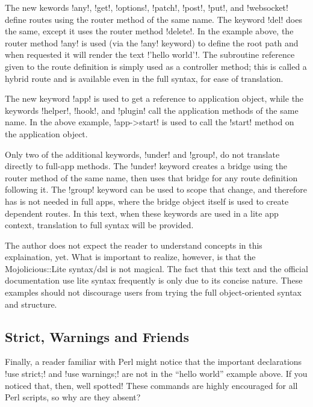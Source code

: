 The new kewords \lstmojolite!any!, \lstmojolite!get!, \lstmojolite!options!, \lstmojolite!patch!, 
\lstmojolite!post!, \lstmojolite!put!, and \lstmojolite!websocket! define routes using the router method of the same name. 
The keyword \lstmojolite!del! does the same, except it uses the router method \lstperl!delete!.
In the example above, the router method \lstperl!any! is used (via the \lstmojolite!any! keyword) 
to define the root path and when requested it will render the text \lstperl!'hello world'!.
The subroutine reference given to the route definition is simply used as a controller method; 
this is called a hybrid route and is available even in the full syntax, for ease of translation.

The new keyword \lstmojolite!app! is used to get a reference to application object, 
while the keywords \lstmojolite!helper!, \lstmojolite!hook!, and \lstmojolite!plugin! call the application methods of the same name.
In the above example, \lstmojolite!app->start! is used to call the \lstperl!start! method on the application object.

Only two of the additional keywords, \lstmojolite!under! and \lstmojolite!group!, do not translate directly to full-app methods.
The \lstmojolite!under! keyword creates a bridge using the router method of the same name, 
then uses that bridge for any route definition following it.
The \lstmojolite!group! keyword can be used to scope that change, and therefore has is not needed in full apps, 
where the bridge object itself is used to create dependent routes.
In this text, when these keywords are used in a lite app context, translation to full syntax will be provided.

The author does not expect the reader to understand concepts in this explaination, yet.
What is important to realize, however, is that the Mojolicious::Lite syntax/dsl is not magical.
The fact that this text and the official documentation use lite syntax frequently is only due to its concise nature.
These examples should not discourage users from trying the full object-oriented syntax and structure.

\subsection{Strict, Warnings and Friends}

Finally, a reader familiar with Perl might notice that the important declarations \lstperl!use strict;! 
and \lstperl!use warnings;! are not in the ``hello world'' example above.
If you noticed that, then, well spotted!
These commands are highly encouraged for all Perl scripts, so why are they absent?

